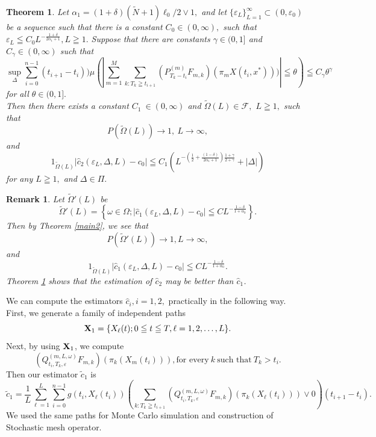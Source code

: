 \documentclass[12pt]{article}
\newtheorem{theorem}[thm]{Theorem}
\newtheorem{remark}[thm]{Remark}
\begin{document}
\begin{theorem}\label{main1} 
Let $\alpha_1 = (1+\delta)(\tilde{N}+1)\ell_0/2 \vee 1,$ and
let $\{\varepsilon_L\}_{L = 1}^{\infty} \subset (0, \varepsilon_0)$ be a sequence such that there is a constant $C_0 \in (0,\infty),$ 
such that $\varepsilon_L \leqq C_0 L^{-\frac{1+ \delta}{2\alpha_1+1}}, L \geqq 1.$ 
Suppose that there are constants $ \gamma \in (0,1]$  and $C_{\gamma} \in (0, \infty)$ such that
 $$\sup_{\Delta} \sum_{i=0}^{n-1} (t_{i+1}-t_i)){\mu} (| \sum_{m=1}^M\sum_{k:T_k\geqq t_{i+1}} (P_{T_k-t_i}^{(m)}F_{m,k})(\pi_m X(t_i,x^*)))| \leqq \theta ) \leqq C_{\gamma}\theta^{\gamma}$$
for all $ \theta \in (0,1].$\\
Then then there exists a constant $C_1\ \in (0,\infty)$ and $\tilde{\Omega}(L) \in \mathcal{F},$  $L\geqq 1 ,$ such that
$$P(\tilde{\Omega}(L)) \to 1, \ L\to \infty,$$
and
$$
1_{\tilde{\Omega}(L)}|\hat{c}_2(\varepsilon_L, \Delta, L)-c_{0}|
\leqq  C_1
(L^{-(\frac{1}{2}+ \frac{(1-\delta)}{2 \alpha_1 +1}) \frac{1+\gamma}{2+\gamma}}+|\Delta|)
$$
for any $L\geqq 1,$ and $\Delta \in \Pi.$
\end{theorem}

\begin{remark}\label{actual}
Let $\tilde{\Omega}'(L)$ be
$$ \tilde{\Omega}'(L)=\left \{\omega \in \Omega; |\hat{c}_1(\varepsilon_L,\Delta,L) - c_0 | \leqq CL^{-\frac{1-\delta}{1+\alpha_0}} \right\}.$$
Then by Theorem \ref{main2}, we see that
$$
P(\tilde{\Omega}'(L)) \to 1,  L\to \infty,
$$
and
$$1_{\tilde{\Omega}(L) }|\hat{c}_1(\varepsilon_L,\Delta,L)-c_0| \leqq CL^{-\frac{1-\delta}{1+\alpha_0}}.
$$
Theorem \ref{main1} shows that the estimation of $\hat{c}_2$ may be better than $\hat{c}_1$. 
\end{remark}

We can compute the estimators $\hat{c}_i, i=1,2,$ practically in the following way.\\  
\noindent First, we generate a family of independent paths 
$${\bf X}_1 = \{X_{\ell }(t); 0 \leqq t \leqq T, \ell =1,2,\ldots ,L\}.$$
Next, by using ${\bf X}_1$, we compute
$$(Q_{t_i,T_k,\varepsilon}^{(m,L,\omega)}F_{m,k})(\pi_k(X_m(t_i))), \text{for every}\  k \  \text{such that} \ T_k > t_i .$$
Then our estimator $\tilde{c}_1$ is
$$\tilde{c}_1=\frac{1}{L} \sum_{\ell=1}^L \sum_{i=0}^{n-1} g(t_i, X_{\ell}(t_i))( \sum_{k:T_k\geqq t_{i+1}} (Q_{t_i,T_k,\varepsilon}^{(m,L,\omega)}F_{m,k})(\pi_k(X_{\ell}(t_i)))\vee0)(t_{i+1}-t_i). $$
We used the same paths for Monte Carlo simulation and construction  of Stochastic mesh operator. 
\end{document}
